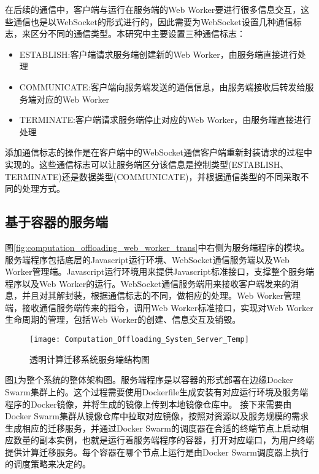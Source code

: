在后续的通信中，客户端与运行在服务端的Web Worker要进行很多信息交互，这些通信也是以WebSocket的形式进行的，因此需要为WebSocket设置几种通信标志，来区分不同的通信类型。本研究中主要设置三种通信标志：
\begin{itemize}
    \item ESTABLISH:客户端请求服务端创建新的Web Worker，由服务端直接进行处理
    \item COMMUNICATE:客户端向服务端发送的通信信息，由服务端接收后转发给服务端对应的Web Worker
    \item TERMINATE:客户端请求服务端停止对应的Web Worker，由服务端直接进行处理
\end{itemize}

添加通信标志的操作是在客户端中的WebSocket通信客户端重新封装请求的过程中实现的。这些通信标志可以让服务端区分该信息是控制类型(ESTABLISH、TERMINATE)还是数据类型(COMMUNICATE)，并根据通信类型的不同采取不同的处理方式。

\subsection{基于容器的服务端}

图\ref{fig:computation_offloading_web_worker_trans}中右侧为服务端程序的模块。服务端程序包括底层的Javascript运行环境、WebSocket通信服务端以及Web Worker管理端。Javascript运行环境用来提供Javascript标准接口，支撑整个服务端程序以及Web Worker的运行。WebSocket通信服务端用来接收客户端发来的消息，并且对其解封装，根据通信标志的不同，做相应的处理。Web Worker管理端，接收通信服务端传来的指令，调用Web Worker标准接口，实现对Web Worker生命周期的管理，包括Web Worker的创建、信息交互及销毁。

\begin{figure}[!htbp]
    \centering
    \texttt{[image: Computation\_Offloading\_System\_Server\_Temp]}
    \caption{透明计算迁移系统服务端结构图}
    \label{fig:computation_offloading_system_server}
\end{figure}

图\ref{fig:computation_offloading_system_server}为整个系统的整体架构图。服务端程序是以容器的形式部署在边缘Docker Swarm集群上的。这个过程需要使用Dockerfile生成安装有对应运行环境及服务端程序的Docker镜像，并将生成的镜像上传到本地镜像仓库中。
接下来需要由Docker Swarm集群从镜像仓库中拉取对应镜像，按照对资源以及服务规模的需求生成相应的迁移服务，并通过Docker Swarm的调度器在合适的终端节点上启动相应数量的副本实例，也就是运行着服务端程序的容器，打开对应端口，为用户终端提供计算迁移服务。每个容器在哪个节点上运行是由Docker Swarm调度器上执行的调度策略来决定的。

